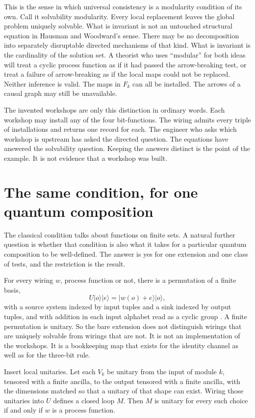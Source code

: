 \documentclass[11pt]{article}
\begin{document}
This is the sense in which universal consistency is a modularity condition of its own. Call it solvability modularity. Every local replacement leaves the global problem uniquely solvable. What is invariant is not an untouched structural equation in Hausman and Woodward's sense. There may be no decomposition into separately disruptable directed mechanisms of that kind. What is invariant is the cardinality of the solution set. A theorist who uses ``modular'' for both ideas will treat a cyclic process function as if it had passed the arrow-breaking test, or treat a failure of arrow-breaking as if the local maps could not be replaced. Neither inference is valid. The maps in \(F_k\) can all be installed. The arrows of a causal graph may still be unavailable.

The invented workshops are only this distinction in ordinary words. Each workshop may install any of the four bit-functions. The wiring admits every triple of installations and returns one record for each. The engineer who asks which workshop is upstream has asked the directed question. The equations have answered the solvability question. Keeping the answers distinct is the point of the example. It is not evidence that a workshop was built.

\section{The same condition, for one quantum composition}
\label{sec:lift}

The classical condition talks about functions on finite sets. A natural further question is whether that condition is also what it takes for a particular quantum composition to be well-defined. The answer is yes for one extension and one class of tests, and the restriction is the result.

For every wiring \(w\), process function or not, there is a permutation of a finite basis,
\[
U\lvert o\rangle\lvert e\rangle=\lvert w(o)+e\rangle\lvert o\rangle,
\]
with a source system indexed by input tuples and a sink indexed by output tuples, and with addition in each input alphabet read as a cyclic group \citep{baumeler2019}. A finite permutation is unitary. So the bare extension does not distinguish wirings that are uniquely solvable from wirings that are not. It is not an implementation of the workshops. It is a bookkeeping map that exists for the identity channel as well as for the three-bit rule.

Insert local unitaries. Let each \(V_k\) be unitary from the input of module \(k\), tensored with a finite ancilla, to the output tensored with a finite ancilla, with the dimensions matched so that a unitary of that shape can exist. Wiring those unitaries into \(U\) defines a closed loop \(M\). Then \(M\) is unitary for every such choice if and only if \(w\) is a process function.
\end{document}
